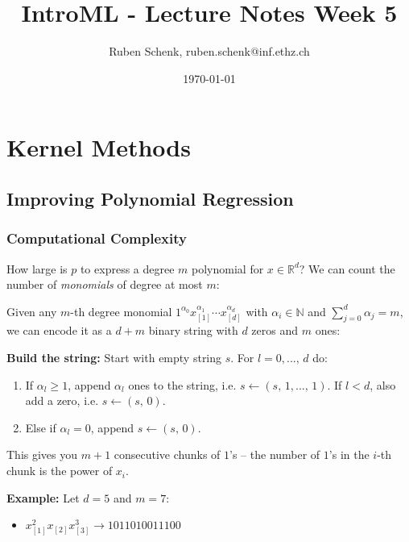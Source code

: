 \documentclass[a4paper]{extarticle}
\title{IntroML - Lecture Notes Week 5}
\author{Ruben Schenk, ruben.schenk@inf.ethz.ch}
\date{\today}
\begin{document}
\maketitle

\section{Kernel Methods}

\subsection{Improving Polynomial Regression}

\subsubsection{Computational Complexity}

How large is $p$ to express a degree $m$ polynomial for $x \in \mathbb{R}^d$? We can count the number of \textit{monomials} of degree at most $m$:

Given any $m$-th degree monomial $1^{\alpha_0}x_{[1]}^{\alpha_1} \cdots x_{[d]}^{\alpha_d}$ with $\alpha_i \in \mathbb{N}$ and $\sum_{j = 0}^d \alpha_j = m$, we can encode it as a $d + m$ binary string with $d$ zeros and $m$ ones:

\begin{cbox}
    \textbf{Build the string:} Start with empty string $s$. For $l = 0,..., \, d$ do:
        \begin{enumerate}
            \item If $\alpha_l \geq 1$, append $\alpha_l$ ones to the string, i.e. $s \leftarrow (s, \, 1,..., \, 1)$. If $l < d$, also add a zero, i.e. $s \leftarrow (s, \, 0)$.
            \item Else if $\alpha_l = 0$, append $s \leftarrow (s, \, 0)$.
        \end{enumerate}
        This gives you $m + 1$ consecutive chunks of $1$'s -- the number of $1$'s in the $i$-th chunk is the power of $x_i$.
\end{cbox}

\begin{ebox}
    \textbf{Example:} Let $d = 5$ and $m = 7$:
    \begin{itemize}
        \item $x_{[1]}^2 x_{[2]} x_{[3]}^3 \rightarrow 1011010011100$
    \end{itemize}
\end{ebox}
\end{document}
